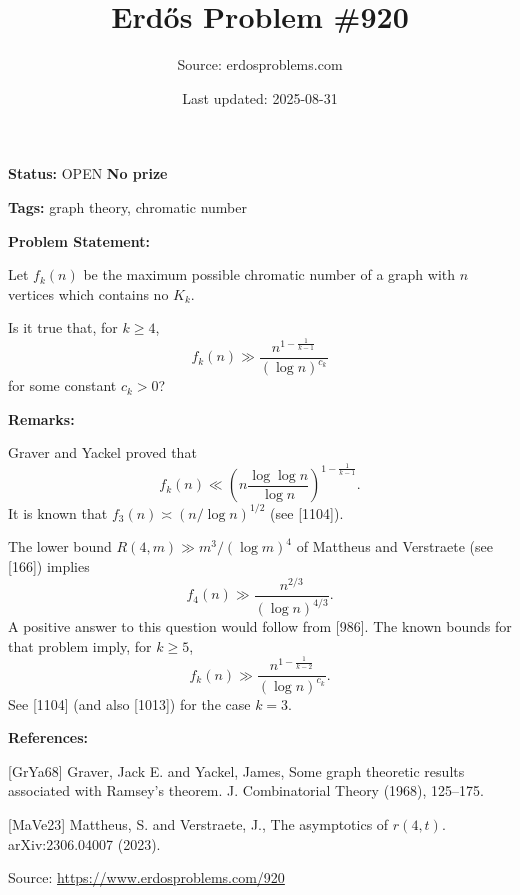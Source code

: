 \documentclass{article}
\title{Erd\H{o}s Problem \#920}
\date{Last updated: 2025-08-31}
\author{Source: erdosproblems.com}
\begin{document}
\maketitle

\noindent\textbf{Status:} OPEN \quad \textbf{No prize}

\noindent\textbf{Tags:} graph theory, chromatic number

\medskip
\noindent\textbf{Problem Statement:}

Let $f_k(n)$ be the maximum possible chromatic number of a graph with $n$ vertices which contains no $K_k$.

Is it true that, for $k\geq 4$,\[f_k(n) \gg \frac{n^{1-\frac{1}{k-1}}}{(\log n)^{c_k}}\]for some constant $c_k>0$?

\bigskip
\noindent\textbf{Remarks:}

Graver and Yackel \cite{GrYa68} proved that\[f_k(n) \ll \left(n\frac{\log\log n}{\log n}\right)^{1-\frac{1}{k-1}}.\]It is known that $f_3(n)\asymp (n/\log n)^{1/2}$ (see [1104]). 

The lower bound $R(4,m) \gg m^3/(\log m)^4$ of Mattheus and Verstraete \cite{MaVe23} (see [166]) implies\[f_4(n) \gg \frac{n^{2/3}}{(\log n)^{4/3}}.\]A positive answer to this question would follow from [986]. The known bounds for that problem imply, for $k\geq 5$,\[f_k(n) \gg \frac{n^{1-\frac{1}{k-2}}}{(\log n)^{c_k}}.\]See [1104] (and also [1013]) for the case $k=3$.

\bigskip
\noindent\textbf{References:}

[GrYa68] Graver, Jack E. and Yackel, James, Some graph theoretic results associated with Ramsey's theorem. J. Combinatorial Theory (1968), 125--175.
 
 [MaVe23] Mattheus, S. and Verstraete, J., The asymptotics of $r(4,t)$. arXiv:2306.04007 (2023).

\bigskip
\noindent\small{Source: \url{https://www.erdosproblems.com/920}}
\end{document}
